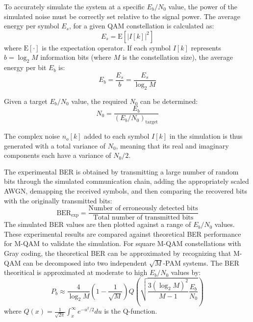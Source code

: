 To accurately simulate the system at a specific $E_b/N_0$ value, the power of the simulated noise must be correctly set relative to the signal power. The average energy per symbol $E_s$, for a given QAM constellation is calculated as:
\begin{equation}
    E_s = \text{E}\left[|I[k]|^2\right]
\end{equation}
where $\text{E}[\cdot]$ is the expectation operator. If each symbol $I[k]$ represents $b = \log_2 M$ information bits (where $M$ is the constellation size), the average energy per bit $E_b$ is:
\begin{equation}
    E_b = \frac{E_s}{b} = \frac{E_s}{\log_2 M}
\end{equation}

\par
Given a target $E_b/N_0$ value, the required $N_0$ can be determined:
\begin{equation}
    N_0 = \frac{E_b}{(E_b/N_0)_{\text{target}}}
\end{equation}

\par
The complex noise $n_o[k]$ added to each symbol $I[k]$ in the simulation is thus generated with a total variance of $N_0$, meaning that its real and imaginary components each have a variance of $N_0/2$.

The experimental BER is obtained by transmitting a large number of random bits through the simulated communication chain, adding the appropriately scaled AWGN, demapping the received symbols, and then comparing the recovered bits with the originally transmitted bits:
\begin{equation}
    \text{BER}_{\text{exp}} = \frac{\text{Number of erroneously detected bits}}{\text{Total number of transmitted bits}}
\end{equation}
The simulated BER values are then plotted against a range of $E_b/N_0$ values. These experimental results are compared against theoretical BER performance for M-QAM to validate the simulation. For square M-QAM constellations with Gray coding, the theoretical BER can be approximated by recognizing that M-QAM can be decomposed into two independent $\sqrt{M}$-PAM systems. The BER theoritical is approximated at moderate to high $E_b/N_0$ values by:
\begin{equation}
    P_b \approx \frac{4}{\log_2 M} \left(1 - \frac{1}{\sqrt{M}}\right) Q\left(\sqrt{\frac{3 (\log_2 M)^2}{M-1} \frac{E_b}{N_0}}\right)
    \label{eq:Pb_MQAM_Eb_cont}
\end{equation}
where $Q(x) = \frac{1}{\sqrt{2\pi}} \int_x^\infty e^{-u^2/2} du$ is the Q-function.

